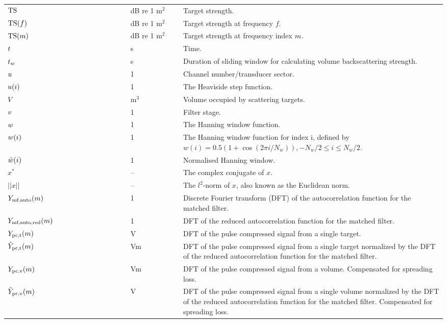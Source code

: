 \documentclass[12pt,a4paper]{article}
\begin{document}
\begin{longtable}{p{0.15\linewidth} p{0.13\linewidth} p{0.12\linewidth} p{0.6\linewidth} }
$\textrm{TS}$ & & dB re 1 $\textrm{m}^2$ & Target strength.\\
$\textrm{TS}(f)$ & & dB re 1 $\textrm{m}^2$ & Target strength at frequency $f$.\\
$\textrm{TS}(m)$ & & dB re 1 $\textrm{m}^{2}$ & Target strength at frequency index $m$.\\

$t$ & & s &  Time.\\
$t_w$ & & s & Duration of sliding window for calculating volume backscattering strength.\\

$u$ & & 1 & Channel number/transducer sector.\\
$u(i)$ & & 1 & The Heaviside step function. \\
$V$ & & $\textrm{m}^3$ & Volume occupied by scattering targets.\\
$v$ & & 1 & Filter stage.\\

$w$ & & 1 & The Hanning window function.\\
$w(i)$ & & 1 & The Hanning window function for index i, defined by $w(i) = 0.5(1+\cos (2\pi i /N_w)), -N_w/2 \leq i \leq N_w/2$.\\
$\tilde{w}(i)$ & & 1 & Normalised Hanning window.\\

$x^*$ & & -- & The complex conjugate of $x$.\\
$||x||$ & & -- & The $l^2$-norm of $x$, also known as the Euclidean norm.\\

$Y_{\textrm{mf,auto}}(m)$ & & 1 & Discrete Fourier transform (DFT) of the autocorrelation function for the matched filter.\\
$Y_{\textrm{mf,auto,red}}(m)$ & & 1 & DFT of the reduced autocorrelation function for the matched filter.\\
$Y_{\textrm{pc,t}}(m)$ & & V & DFT of the pulse compressed signal from a single target.\\
$\tilde{Y}_{\textrm{pc,t}}(m)$ & & Vm & DFT of the pulse compressed signal from a single target 
normalized by the DFT of the reduced autocorrelation function for the matched filter.\\
$Y_{\textrm{pc,v}}(m)$ & & Vm & DFT of the pulse compressed signal from a volume. Compensated for spreading loss.\\
$\tilde{Y}_{\textrm{pc,v}}(m)$ & & V & DFT of the pulse compressed signal from a single volume normalized by the DFT of the reduced autocorrelation function for the matched filter.  Compensated for spreading loss.\\


\end{longtable}
\end{document}
